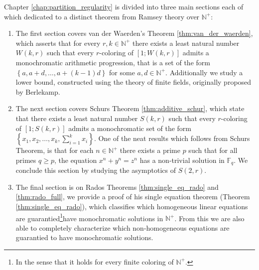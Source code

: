 Chapter \ref{chap:partition_regularity} is divided into three main sections each of which dedicated to a distinct theorem from Ramsey theory over $\mathbb{N}^{+}$:
\begin{enumerate}[label=\arabic*.]
	\item The first section covers van der Waerden's Theorem \ref{thm:van_der_waerden}, which asserts that for every $r, k \in \mathbb{N}^+$ there exists a least natural number $W(k, r)$ such that every $r$-coloring of $[1; W(k, r)]$ admits a monochromatic arithmetic progression, that is a set of the form $\left\{a, a + d, \ldots, a + (k- 1)d\right\}$ for some $a, d \in \mathbb{N}^{+}$. Additionally we study a lower bound, constructed using the theory of finite fields, originally proposed by Berlekamp.
	\item The next section covers Schurs Theorem \ref{thm:additive_schur}, which state that there exists a least natural number $S(k, r)$ such that every $r$-coloring of $[1; S(k, r)]$ admits a monochromatic set of the form $\left\{x_1, x_2, \ldots, x_{k}, \sum^k_{i = 1} x_i\right\}$. One of the neat results which follows from Schurs Theorem, is that for each $n \in \mathbb{N}^{+}$ there exists a prime $p$ such that for all primes $q \geq p$, the equation $x^{n} + y^{n} = z^{n}$ has a non-trivial solution in $\mathbb{F}_q$. We conclude this section by studying the asymptotics of $S(2, r)$.
	\item The final section is on Rados Theorems \ref{thm:single_eq_rado} and \ref{thm:rado_full}, we provide a proof of his single equation theorem (Theorem \ref{thm:single_eq_rado}), which classifies which homogeneous linear equations are guarantied\footnote{In the sense that it holds for every finite coloring of $\mathbb{N}^{+}$.}have monochromatic solutions in $\mathbb{N}^+$. From this we are also able to completely characterize which non-homogeneous equations are guarantied to have monochromatic solutions.
\end{enumerate}

